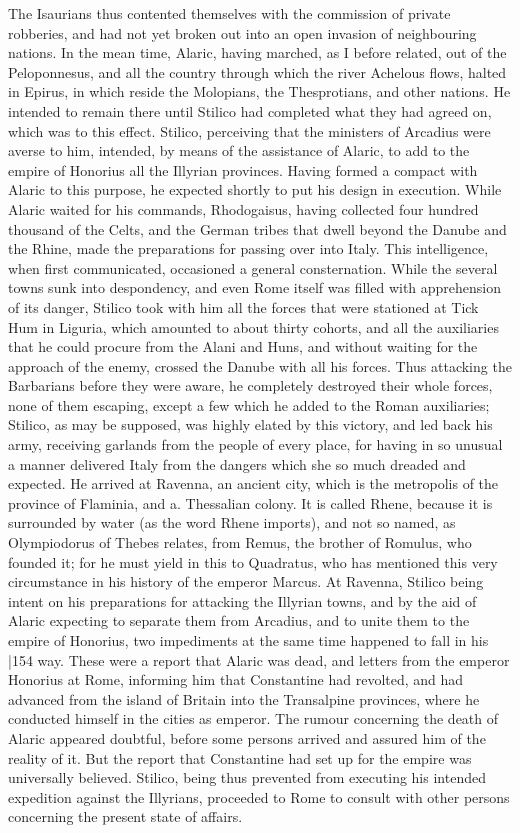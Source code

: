 The Isaurians thus contented themselves with the commission of private robberies, and had not yet broken out into an open invasion of neighbouring nations. In the mean time, Alaric, having marched, as I before related, out of the Peloponnesus, and all the country through which the river Achelous flows, halted in Epirus, in which reside the Molopians, the Thesprotians, and other nations. He intended to remain there until Stilico had completed what they had agreed on, which was to this effect. Stilico, perceiving that the ministers of Arcadius were averse to him, intended, by means of the assistance of Alaric, to add to the empire of Honorius all the Illyrian provinces. Having formed a compact with Alaric to this purpose, he expected shortly to put his design in execution. While Alaric waited for his commands, Rhodogaisus, having collected four hundred thousand of the Celts, and the German tribes that dwell beyond the Danube and the Rhine, made the preparations for passing over into Italy. This intelligence, when first communicated, occasioned a general consternation. While the several towns sunk into despondency, and even Rome itself was filled with apprehension of its danger, Stilico took with him all the forces that were stationed at Tick Hum in Liguria, which amounted to about thirty cohorts, and all the auxiliaries that he could procure from the Alani and Huns, and without waiting for the approach of the enemy, crossed the Danube with all his forces. Thus attacking the Barbarians before they were aware, he completely destroyed their whole forces, none of them escaping, except a few which he added to the Roman auxiliaries; Stilico, as may be supposed, was highly elated by this victory, and led back his army, receiving garlands from the people of every place, for having in so unusual a manner
delivered Italy from the dangers which she so much dreaded and expected. He arrived at Ravenna, an ancient city, which is the metropolis of the province of Flaminia, and a. Thessalian colony. It is called Rhene, because it is surrounded by water (as the word Rhene imports), and not so named, as Olympiodorus of Thebes relates, from Remus, the brother of Romulus, who founded it; for he must yield in this to Quadratus, who has mentioned this very circumstance in his history of the emperor Marcus. At Ravenna, Stilico being intent on his preparations for attacking the Illyrian towns, and by the aid of Alaric expecting to separate
them from Arcadius, and to unite them to the empire of Honorius, two impediments at the same time happened to fall in his
|154 way. These were a report that Alaric was dead, and letters from the emperor Honorius at Rome, informing him that Constantine had revolted, and had advanced from the island of Britain into the Transalpine provinces, where he conducted himself in the cities as emperor. The rumour concerning the death of Alaric appeared doubtful, before some persons arrived and assured him of the reality of it. But the report that Constantine had set up for the empire was universally believed. Stilico, being thus prevented from executing his intended expedition against the Illyrians, proceeded to Rome to consult with other persons concerning the present state of affairs.

